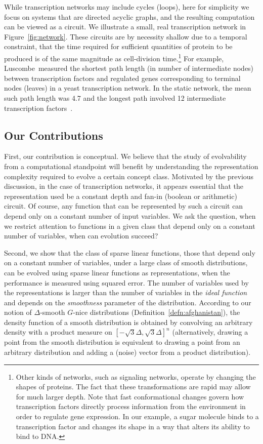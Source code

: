 While transcription networks may include cycles (loops), here for simplicity we
focus on systems that are directed acyclic graphs, and the resulting computation
can be viewed as a circuit. We illustrate a small, real transcription network in
Figure~\ref{fig:network}. These circuits are by necessity shallow due to
a temporal constraint, that the time required for sufficient quantities of
protein to be produced is of the same magnitude as cell-division
time.\footnote{Other kinds of networks, such as signaling networks, operate by
changing the shapes of proteins. The fact that these transformations are rapid
may allow for much larger depth. Note that fast conformational changes govern
how transcription factors directly process information from the environment in
order to regulate gene expression.  In our example, a sugar molecule binds to a
transcription factor and changes its shape in a way that alters its ability to
bind to DNA.} For example, Luscombe~\etal measured the shortest path length (in
number of intermediate nodes) between transcription factors and regulated genes
corresponding to terminal nodes (leaves) in a yeast transcription network. In
the static network, the mean such path length was 4.7 and the longest path
involved 12 intermediate transcription factors~\cite{Luscombe:2004}.

\subsection{Our Contributions}

First, our contribution is conceptual. We believe that the study of evolvability
from a computational standpoint will benefit by understanding the representation
complexity required to evolve a certain concept class. Motivated by the previous
discussion, in the case of transcription networks, it appears essential that the
representation used be a constant depth and fan-in (boolean or arithmetic)
circuit. Of course, any function that can be represented by such a circuit can
depend only on a constant number of input variables. We ask the
question, when we restrict attention to functions in a given class that depend
only on a constant number of variables, when can evolution succeed?

Second, we show that the class of sparse linear functions, those that depend
only on a constant number of variables, under a large class of smooth
distributions, can be evolved using sparse linear functions as representations,
when the performance is measured using squared error. The number of variables
used by the representations is larger than the number of variables in the
\emph{ideal function} and depends on the \emph{smoothness} parameter of the
distribution. According to our notion of $\Delta$-smooth $G$-nice distributions
(Definition~\ref{defn:afghanistan}), the density function of a smooth distribution
is obtained by convolving an arbitrary density with a product measure on
$[-\sqrt{3}\Delta, \sqrt{3}\Delta]^n$ (alternatively, drawing a point from the
smooth distribution is equivalent to drawing a point from an arbitrary
distribution and adding a (noise) vector from a product distribution). 

